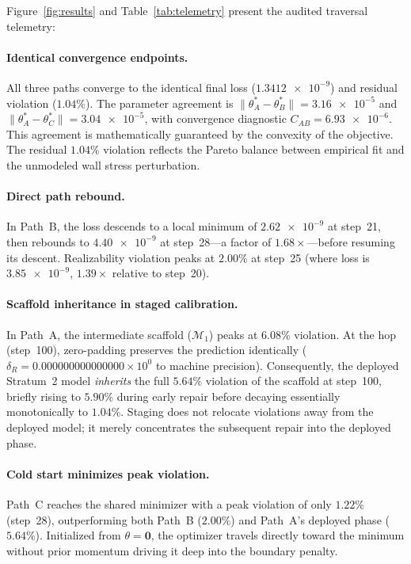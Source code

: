 \documentclass[preprint,aps,prb,longbibliography,superscriptaddress]{revtex4-2}
\begin{document}
Figure~\ref{fig:results} and Table~\ref{tab:telemetry} present the audited
traversal telemetry:

\paragraph{Identical convergence endpoints.}
All three paths converge to the identical final loss ($\num{1.3412e-9}$) and
residual violation ($1.04\%$). The parameter agreement is
$\|\theta_A^* - \theta_B^*\| = \num{3.16e-5}$ and
$\|\theta_A^* - \theta_C^*\| = \num{3.04e-5}$, with convergence diagnostic
$C_{AB} = \num{6.93e-6}$. This agreement is mathematically guaranteed by the
convexity of the objective. The residual $1.04\%$ violation reflects the
Pareto balance between empirical fit and the unmodeled wall stress perturbation.

\paragraph{Direct path rebound.}
In Path~B, the loss descends to a local minimum of $\num{2.62e-9}$ at step~21,
then rebounds to $\num{4.40e-9}$ at step~28---a factor of $1.68\times$---before
resuming its descent. Realizability violation peaks at $2.00\%$ at step~25
(where loss is $\num{3.85e-9}$, $1.39\times$ relative to step~20).

\paragraph{Scaffold inheritance in staged calibration.}
In Path~A, the intermediate scaffold ($\mathcal{M}_1$) peaks at $6.08\%$
violation. At the hop (step~100), zero-padding preserves the prediction
identically ($\delta_R = 0.000000000000000\times 10^0$ to machine precision).
Consequently, the deployed Stratum~2 model \emph{inherits} the full $5.64\%$
violation of the scaffold at step~100, briefly rising to $5.90\%$ during early
repair before decaying essentially monotonically to $1.04\%$. Staging does not
relocate violations away from the deployed model; it merely concentrates the
subsequent repair into the deployed phase.

\paragraph{Cold start minimizes peak violation.}
Path~C reaches the shared minimizer with a peak violation of only $1.22\%$
(step~28), outperforming both Path~B ($2.00\%$) and Path~A's deployed phase
($5.64\%$). Initialized from $\theta = \mathbf{0}$, the optimizer travels
directly toward the minimum without prior momentum driving it deep into the
boundary penalty.
\end{document}

